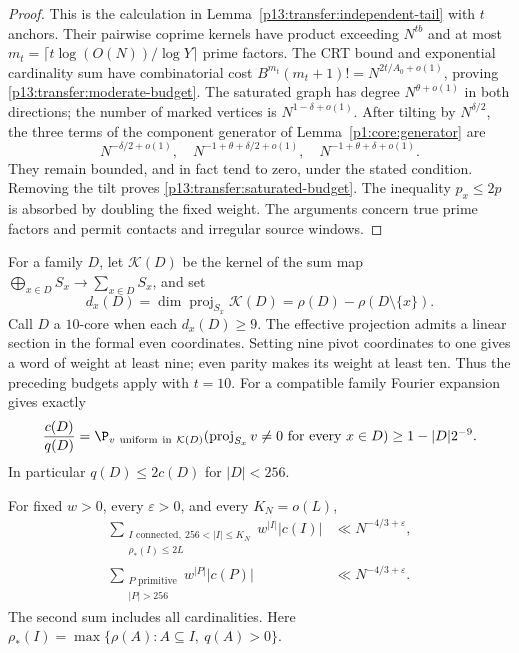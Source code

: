 \begin{proof}
This is the calculation in Lemma~\ref{p13:transfer:independent-tail}
with $t$ anchors. Their pairwise coprime kernels have product exceeding
$N^{tb}$ and at most
$m_t=\lceil t\log(O(N))/\log Y\rceil$ prime factors.
The CRT bound and exponential cardinality sum have combinatorial cost
$B^{m_t}(m_t+1)!=N^{2t/A_0+o(1)}$, proving
\eqref{p13:transfer:moderate-budget}.
The saturated graph has degree $N^{\theta+o(1)}$ in both directions;
the number of marked vertices is $N^{1-\delta+o(1)}$.
After tilting by $N^{\delta/2}$, the three terms of the component
generator of Lemma~\ref{p1:core:generator} are
\[
 N^{-\delta/2+o(1)},\quad
 N^{-1+\theta+\delta/2+o(1)},\quad
 N^{-1+\theta+\delta+o(1)}.
\]
They remain bounded, and in fact tend to zero, under the stated
condition. Removing the tilt proves
\eqref{p13:transfer:saturated-budget}. The inequality $p_x\leq2p$
is absorbed by doubling the fixed weight. The arguments concern true
prime factors and permit contacts and irregular source windows.
\end{proof}

For a family $D$, let $\mathcal K(D)$ be the kernel of the sum map
$\bigoplus_{x\in D}S_x\to\sum_{x\in D}S_x$, and set
\[
 d_x(D)=\dim\operatorname{proj}_{S_x}\mathcal K(D)
       =\rho(D)-\rho(D\setminus\{x\}).
\]
Call $D$ a $10$-core when each $d_x(D)\geq9$.
The effective projection admits a linear section in the formal even
coordinates. Setting nine pivot coordinates to one gives a word of
weight at least nine; even parity makes its weight at least ten.
Thus the preceding budgets apply with $t=10$.
For a compatible family Fourier expansion gives exactly
\begin{equation}
 \frac{c(D)}{q(D)}
 =\P_{v\ \mathrm{uniform\ in}\ \mathcal K(D)}
       (\operatorname{proj}_{S_x}v\ne0\text{ for every }x\in D)
 \geq1-|D|2^{-9}.
 \label{p13:transfer:core-ratio}
\end{equation}
In particular $q(D)\leq2c(D)$ for $|D|<256$.

\begin{proposition}
\label{p13:transfer:uniform-tail}
For fixed $w>0$, every $\varepsilon>0$, and every $K_N=o(L)$,
\begin{align}
 \sum_{\substack{I\text{ connected},\ 256<|I|\leq K_N\\
                         \rho_*(I)\leq2L}}
              w^{|I|}|c(I)|&\ll N^{-4/3+\varepsilon},
                    \label{p13:transfer:connected-tail}\\
 \sum_{\substack{P\text{ primitive}\\|P|>256}}
              w^{|P|}|c(P)|&\ll N^{-4/3+\varepsilon}.
                    \label{p13:transfer:primitive-tail}
\end{align}
The second sum includes all cardinalities. Here
$\rho_*(I)=\max\{\rho(A):A\subseteq I,\ q(A)>0\}$.
\end{proposition}

